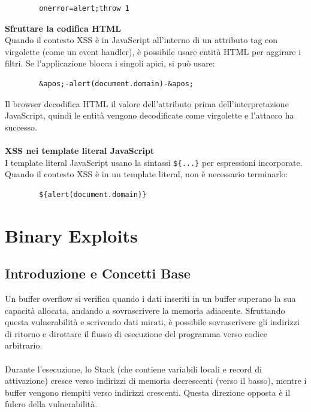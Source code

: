 \documentclass[12pt,a4paper]{report}
\begin{document}
	\begin{lstlisting}
		onerror=alert;throw 1
	\end{lstlisting}
	\textbf{Sfruttare la codifica HTML}\\
	Quando il contesto XSS è in JavaScript all'interno di un attributo tag con virgolette (come un event handler), è possibile usare entità HTML per aggirare i filtri. Se l'applicazione blocca i singoli apici, si può usare:
	
	\begin{lstlisting}
		&apos;-alert(document.domain)-&apos;
	\end{lstlisting}
	Il browser decodifica HTML il valore dell'attributo prima dell'interpretazione JavaScript, quindi le entità vengono decodificate come virgolette e l'attacco ha successo.\\\\
	\textbf{XSS nei template literal JavaScript}\\
	I template literal JavaScript usano la sintassi \texttt{\$\{...\}} per espressioni incorporate. Quando il contesto XSS è in un template literal, non è necessario terminarlo:
	
	\begin{lstlisting}
		${alert(document.domain)}
	\end{lstlisting}
	
	\chapter{Binary Exploits}	
	
	\section{Introduzione e Concetti Base}
	Un buffer overflow si verifica quando i dati inseriti in un buffer superano la sua capacità allocata, andando a sovrascrivere la memoria adiacente. Sfruttando questa vulnerabilità e scrivendo dati mirati, è possibile sovrascrivere gli indirizzi di ritorno e dirottare il flusso di esecuzione del programma verso codice arbitrario.	\\\\
	Durante l'esecuzione, lo Stack (che contiene variabili locali e record di attivazione) cresce verso indirizzi di memoria decrescenti (verso il basso), mentre i buffer vengono riempiti verso indirizzi crescenti. Questa direzione opposta è il fulcro della vulnerabilità.
	
\end{document}
